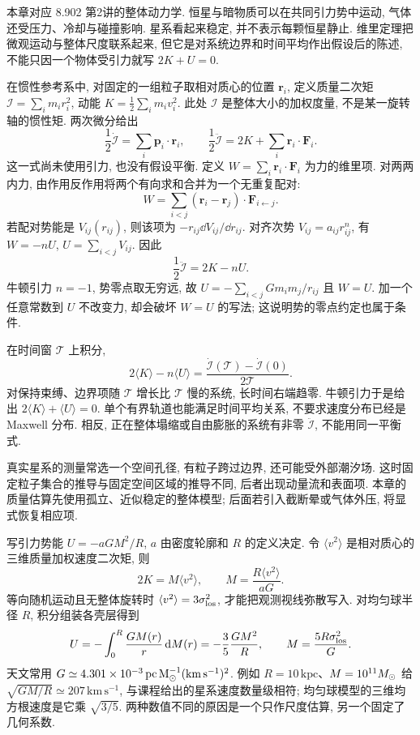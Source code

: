 
本章对应 8.902 第2讲的整体动力学. 恒星与暗物质可以在共同引力势中运动, 气体还受压力、冷却与碰撞影响. 星系看起来稳定, 并不表示每颗恒星静止. 维里定理把微观运动与整体尺度联系起来, 但它是对系统边界和时间平均作出假设后的陈述, 不能只因一个物体受引力就写 $2K+U=0$.

在惯性参考系中, 对固定的一组粒子取相对质心的位置 $\boldsymbol r_i$, 定义质量二次矩 $\mathcal I=\sum_i m_ir_i^2$, 动能 $K=\frac12\sum_im_iv_i^2$. 此处 $\mathcal I$ 是整体大小的加权度量, 不是某一旋转轴的惯性矩. 两次微分给出
\[
\frac12\dot{\mathcal I}=\sum_i\boldsymbol p_i\cdot\boldsymbol r_i,
\qquad
\frac12\ddot{\mathcal I}=2K+\sum_i\boldsymbol r_i\cdot\boldsymbol F_i.
\]
这一式尚未使用引力, 也没有假设平衡. 定义 $W=\sum_i\boldsymbol r_i\cdot\boldsymbol F_i$ 为力的维里项. 对两两内力, 由作用反作用将两个有向求和合并为一个无重复配对:
\[
W=\sum_{i<j}(\boldsymbol r_i-\boldsymbol r_j)\cdot\boldsymbol F_{i\leftarrow j}.
\]
若配对势能是 $V_{ij}(r_{ij})$, 则该项为 $-r_{ij}\dd V_{ij}/\dd r_{ij}$. 对齐次势 $V_{ij}=a_{ij}r_{ij}^{n}$, 有 $W=-nU$, $U=\sum_{i<j}V_{ij}$. 因此
\[
\frac12\ddot{\mathcal I}=2K-nU.
\]
牛顿引力 $n=-1$, 势零点取无穷远, 故 $U=-\sum_{i<j}Gm_im_j/r_{ij}$ 且 $W=U$. 加一个任意常数到 $U$ 不改变力, 却会破坏 $W=U$ 的写法; 这说明势的零点约定也属于条件.

在时间窗 $\mathcal T$ 上积分,
\[
2\langle K\rangle-n\langle U\rangle
=\frac{\dot{\mathcal I}(\mathcal T)-\dot{\mathcal I}(0)}{2\mathcal T}.
\]
对保持束缚、边界项随 $\mathcal T$ 增长比 $\mathcal T$ 慢的系统, 长时间右端趋零. 牛顿引力于是给出 $2\langle K\rangle+\langle U\rangle=0$. 单个有界轨道也能满足时间平均关系, 不要求速度分布已经是 Maxwell 分布. 相反, 正在整体塌缩或自由膨胀的系统有非零 $\ddot{\mathcal I}$, 不能用同一平衡式.

真实星系的测量常选一个空间孔径, 有粒子跨过边界, 还可能受外部潮汐场. 这时固定粒子集合的推导与固定空间区域的推导不同, 后者出现动量流和表面项. 本章的质量估算先使用孤立、近似稳定的整体模型; 后面若引入截断晕或气体外压, 将显式恢复相应项.

写引力势能 $U=-aGM^2/R$, $a$ 由密度轮廓和 $R$ 的定义决定. 令 $\langle v^2\rangle$ 是相对质心的三维质量加权速度二次矩, 则
\[
2K=M\langle v^2\rangle,\qquad
M=\frac{R\langle v^2\rangle}{aG}.
\]
等向随机运动且无整体旋转时 $\langle v^2\rangle=3\sigma_{\rm los}^2$, 才能把观测视线弥散写入. 对均匀球半径 $R$, 积分组装各壳层得到
\[
U=-\int_0^R\frac{GM(r)}r\,\mathrm d M(r)
=-\frac35\frac{GM^2}{R},\qquad
M=\frac{5R\sigma_{\rm los}^2}{G}.
\]
天文常用 $G\simeq4.301\times10^{-3}\,\mathrm{pc\,M_{\odot}^{-1}(km\,s^{-1})^2}$. 例如 $R=10\,\mathrm{kpc}$、$M=10^{11}M_{\odot}$ 给 $\sqrt{GM/R}\simeq207\,\mathrm{km\,s^{-1}}$, 与课程给出的星系速度数量级相符; 均匀球模型的三维均方根速度是它乘 $\sqrt{3/5}$. 两种数值不同的原因是一个只作尺度估算, 另一个固定了几何系数.

